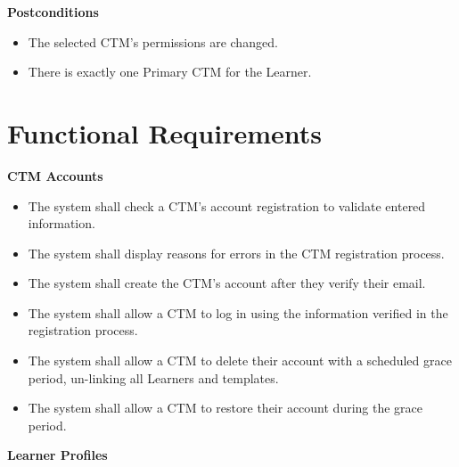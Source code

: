 \documentclass[12pt]{article}
\newcounter{reqnumA} %
\begin{document}
\textbf{Postconditions}
\begin{itemize}
\item The selected CTM's permissions are changed.
\item There is exactly one Primary CTM for the Learner.
\end{itemize}

\section{Functional Requirements}

\noindent \textbf{CTM Accounts}

\noindent \begin{itemize}
  \setcounter{reqnumA}{0}

  \item[\refstepcounter{reqnumA}\thereqnumA \label{FR-CTM-1}:] The system shall check a CTM's account registration to validate entered information.

  \item[\refstepcounter{reqnumA}\thereqnumA \label{FR-CTM-2}:] The system shall display reasons for errors in the CTM registration process.

  \item[\refstepcounter{reqnumA}\thereqnumA \label{FR-CTM-3}:] The system shall create the CTM's account after they verify their email.

  \item[\refstepcounter{reqnumA}\thereqnumA \label{FR-CTM-4}:] The system shall allow a CTM to log in using the information verified in the registration process.

  \item[\refstepcounter{reqnumA}\thereqnumA \label{FR-CTM-5}:] The system shall allow a CTM to delete their account with a scheduled grace period, un-linking all Learners and templates.

  \item[\refstepcounter{reqnumA}\thereqnumA \label{FR-CTM-6}:] The system shall allow a CTM to restore their account during the grace period.

\end{itemize}

\noindent \textbf{Learner Profiles}
\end{document}
